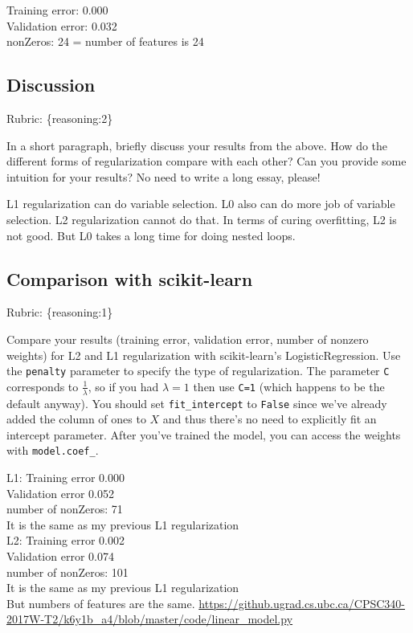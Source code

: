 \documentclass{article}
\def\rubric#1{\gre{Rubric: \{#1\}}}{}
\def\blu#1{{\color{blu}#1}}
\def\gre#1{{\color{gre}#1}}
\begin{document}
\blu{Training error: 0.000\\
Validation error: 0.032\\
 nonZeros: 24 = number of features is 24 }
 



\subsection{Discussion}
\rubric{reasoning:2}

In a short paragraph, briefly discuss your results from the above. How do the
different forms of regularization compare with each other?
Can you provide some intuition for your results? No need to write a long essay, please!

\blu{L1 regularization can do variable selection. L0 also can do more job of variable selection. L2 regularization cannot do that. In terms of curing overfitting, L2 is not good. But L0 takes a long time for doing nested loops.}


\subsection{Comparison with scikit-learn}
\rubric{reasoning:1}

Compare your results (training error, validation error, number of nonzero weights) for L2 and L1 regularization with scikit-learn's LogisticRegression. Use the
\texttt{penalty} parameter to specify the type of regularization. The parameter \texttt{C} corresponds to $\frac{1}{\lambda}$, so if
you had $\lambda=1$ then use \texttt{C=1} (which happens to be the default anyway).
You should set \texttt{fit\string_intercept} to \texttt{False} since we've already added the column of ones to $X$ and thus
there's no need to explicitly fit an intercept parameter. After you've trained the model, you can access the weights
with \texttt{model.coef\string_}.

\blu{
L1:
Training error 0.000\\
Validation error 0.052\\
number of nonZeros: 71\\
It is the same as my previous L1 regularization\\
L2:
Training error 0.002\\
Validation error 0.074\\
number of nonZeros: 101\\
It is the same as my previous L1 regularization
\\ But numbers of features are the same. 
\url{https://github.ugrad.cs.ubc.ca/CPSC340-2017W-T2/k6y1b_a4/blob/master/code/linear_model.py}}
\end{document}
